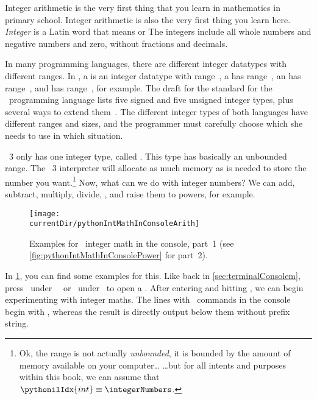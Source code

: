 %
\label{sec:int}%
%
Integer arithmetic is the very first thing that you learn in mathematics in primary school.
Integer arithmetic is also the very first thing you learn here.
\emph{Integer} is a Latin word that means  or 
The integers include all whole numbers and negative numbers and zero, without fractions and decimals.

In many programming languages, there are different integer datatypes with different ranges.
In , a  is an integer datatype with range~, a  has range~, an  has range~, and  has range~, for example.
The draft for the  standard for the ~programming language lists five signed and five unsigned integer types, plus several ways to extend them~\cite{ISOIEC98892017PLCWDOS}.
The different integer types of both languages have different ranges and sizes, and the programmer must carefully choose which she needs to use in which situation.

\python~3 only has one integer type, called .
This type has basically an unbounded range.
The \python~3 interpreter will allocate as much memory as is needed to store the number you want.\footnote{%
Ok, the range is not actually \emph{unbounded}, it is bounded by the amount of memory available on your computer{\dots} {\dots}but for all intents and purposes within this book, we can assume that~$\pythonilIdx{int}\equiv\integerNumbers$.}%
%
%
\label{sec:int:integerArithmetics}%
Now, what can we do with integer numbers?
We can add, subtract, multiply, divide, , and raise them to powers, for example.

\begin{figure}%
\centering%
\texttt{[image: \\currentDir/pythonIntMathInConsoleArith]}%
\caption{Examples for \python\ integer math in the console, part~1 (see \cref{fig:pythonIntMathInConsolePower} for part~2).}%
\label{fig:pythonIntMathInConsoleArith}%
\end{figure}%

In \cref{fig:pythonIntMathInConsoleArith}, you can find some examples for this.
Like back in \cref{sec:terminalConsolem}, press \ubuntuTerminal\ under \ubuntu\ \linux\ or \windowsTerminal\ under \windows\ to open a .
After entering  and hitting \keys{\enter}, we can begin experimenting with integer maths.
The lines with \python\ commands in the console begin with \pythonil{>>>}, whereas the result is directly output below them without prefix string.

